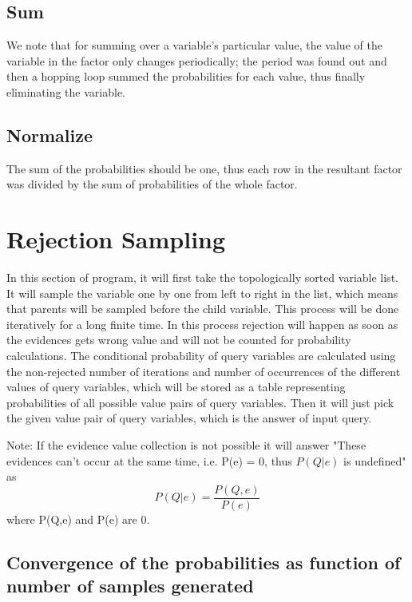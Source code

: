 \documentclass[12pt]{article}
\begin{document}
\subsection{Sum}
We note that for summing over a variable's particular value, the value of the variable in the factor only changes periodically; the period was found out and then a hopping loop summed the probabilities for each value, thus finally eliminating the variable.

\subsection{Normalize}
The sum of the probabilities should be one, thus each row in the resultant factor was divided by the sum of probabilities of the whole factor.

\section{Rejection Sampling}
In this section of program, it will first take the topologically sorted variable list. It will sample the variable one by one from left to right in the list, which means that parents will be sampled before the child variable.
This process will be done iteratively for a long finite time. In this process rejection will happen as soon as the evidences gets wrong value and will not be counted for probability calculations.
The conditional probability of query variables are calculated using the non-rejected number of iterations and number of occurrences of the different values of query variables, which will be stored as a table representing probabilities of all possible value pairs of query variables.
Then it will just pick the given value pair of query variables, which is the answer of input query.

Note: If the evidence value collection is not possible it will answer "These evidences can't occur at the same time, i.e. P(e) = 0, thus \(P(Q|e)\) is undefined"
as
\[P(Q|e)=\frac{P(Q,e)}{P(e)}\]
where P(Q,e) and P(e) are 0.

\subsection{Convergence of the probabilities as function of\\ number of samples generated}
\end{document}
